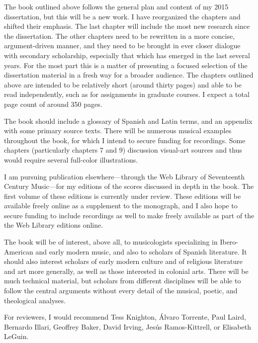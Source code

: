\documentclass{vcbook-proposal}
\begin{document}
The book outlined above follows the general plan and content of my 2015 dissertation, but this will be a new work.
I have reorganized the chapters and shifted their emphasis.
The last chapter will include the most new research since the dissertation.
The other chapters need to be rewritten in a more concise, argument-driven manner, and they need to be brought in ever closer dialogue with secondary scholarship, especially that which has emerged in the last several years.
For the most part this is a matter of presenting a focused selection of the dissertation material in a fresh way for a broader audience.
The chapters outlined above are intended to be relatively short (around thirty pages) and able to be read independently, such as for assignments in graduate courses.
I expect a total page count of around 350 pages.

The book should include a glossary of Spanish and Latin terms, and an appendix with some primary source texts.
There will be numerous musical examples throughout the book, for which I intend to secure funding for recordings.
Some chapters (particularly chapters 7 and 9) discussion visual-art sources and thus would require several full-color illustrations.

I am pursuing publication elsewhere---through the Web Library of Seventeenth Century Music---for my editions of the scores discussed in depth in the book. 
The first volume of these editions is currently under review.
These editions will be available freely online as a supplement to the monograph, and I also hope to secure funding to include recordings as well to make freely available as part of the the Web Library editions online.

The book will be of interest, above all, to musicologists specializing in Ibero-American and early modern music, and also to scholars of Spanish literature.
It should also interest scholars of early modern culture and of religious literature and art more generally, as well as those interested in colonial arts.
There will be much technical material, but scholars from different disciplines will be able to follow the central arguments without every detail of the musical, poetic, and theological analyses.

For reviewers, I would recommend Tess Knighton, Álvaro Torrente, Paul Laird, Bernardo Illari, Geoffrey Baker, David Irving, Jesús Ramos-Kittrell, or Elisabeth LeGuin.

\printbibliography
\end{document}
